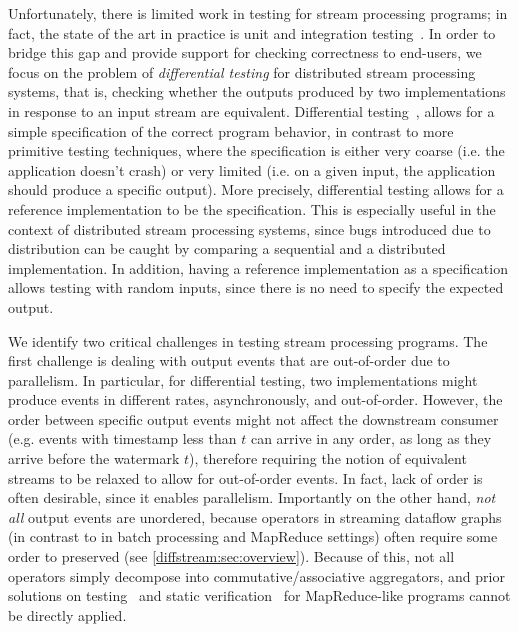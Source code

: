 Unfortunately, there is limited work in testing for stream processing programs; in fact, the state of the art in practice is unit and integration testing~\cite{vianna2019exploratory}.
In order to bridge this gap and provide support for checking correctness to end-users,
we focus on the problem of \emph{differential  testing} for distributed stream processing systems, that is, checking whether the outputs produced by two implementations in response to an input stream are equivalent.
Differential testing~\cite{mckeeman1998differential,groce2007randomized,evans2007differential},
allows for a simple specification of the correct program behavior, in contrast to more primitive testing techniques, where
the specification is either very coarse (i.e. the application doesn't crash) or very limited (i.e. on a given input, the application should produce a specific output).
More precisely, differential testing allows for a reference implementation to be the specification. This is especially useful in the context of distributed stream processing systems, since bugs introduced due to distribution can be caught by comparing a sequential and a distributed implementation. In addition, having a reference implementation as a specification allows testing with random inputs, since there is no need to specify the expected output.

We identify two critical challenges in testing stream processing programs.
The first challenge is dealing with output events that are out-of-order due to parallelism. In particular, for differential testing,
two implementations might produce events in different rates, asynchronously, and out-of-order.
However, the order between specific output events might not affect the downstream consumer (e.g. events with timestamp less than $t$ can arrive in any order, as long as they arrive before the watermark $t$),
therefore requiring the notion of equivalent streams to be relaxed to allow for out-of-order events.
In fact, lack of order is often desirable, since it enables parallelism.
Importantly on the other hand, \emph{not all} output events are unordered, because operators in streaming dataflow graphs (in contrast to in batch processing and MapReduce settings) often require some order to preserved (see \cref{diffstream:sec:overview}).
Because of this, not all operators simply decompose into commutative/associative aggregators, and prior solutions on testing~\cite{csallner2011new,xu2013semantic,marynowski2012testing,chen2016commutativity} and static verification~\cite{liu2014automating,raychev2015parallelizing} for MapReduce-like programs cannot be directly applied.

